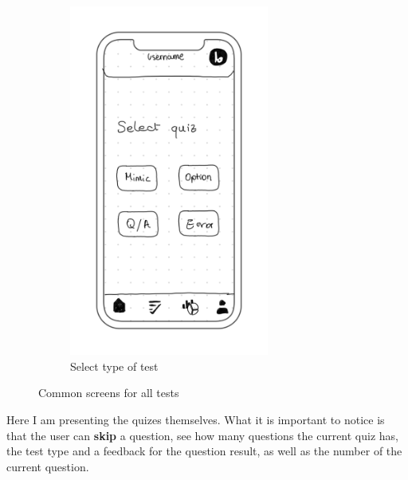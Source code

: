 \begin{figure}[H]
\begin{subfigure}[T]{0.33\textwidth}
        \includegraphics[width=0.72\textwidth]{assets/screens/quiz/common/Select quiz.png}
        \caption{Select type of test}
        \label{fig:design_screen_select_quiz}
    \end{subfigure}
       \caption{Common screens for all tests}
       \label{fig:design_test_common}
\end{figure}
Here I am presenting the quizes themselves. What it is important to notice is that the user can \textbf{skip} a question, see how many questions the current quiz has, the test type and a feedback for the question result, as well as the number of the current question. \\

